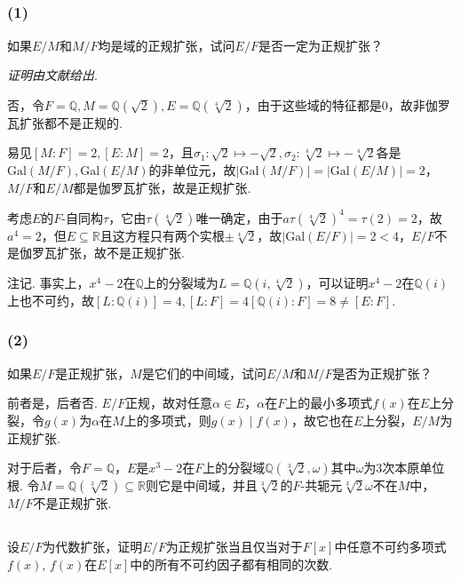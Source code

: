 \subsection{}
\subsubsection{(1)}
如果$E/M$和$M/F$均是域的正规扩张，试问$E/F$是否一定为正规扩张？

\emph{证明由文献}\cite{888841}\cite{575060}\emph{给出}.

\jie 否，令$F=\mathbb{Q}, M=\mathbb{Q}(\sqrt{2}), E=\mathbb{Q}(\sqrt[4]{2})$，由于这些域的特征都是$0$，故非伽罗瓦扩张都不是正规的.

易见$[M:F]=2,[E:M]=2$，且$\sigma_1: \sqrt{2}\mapsto-\sqrt{2}, \sigma_2: \sqrt[4]{2}\mapsto-\sqrt[4]{2}$各是$\mathrm{Gal}(M/F),\mathrm{Gal}(E/M)$的非单位元，故$|\mathrm{Gal}(M/F)|=|\mathrm{Gal}(E/M)|=2$，$M/F$和$E/M$都是伽罗瓦扩张，故是正规扩张.

考虑$E$的$F$-自同构$\tau$，它由$\tau(\sqrt[4]{2})$唯一确定，由于$a\tau(\sqrt[4]{2})^4=\tau(2)=2$，故$a^4=2$，但$E\subseteq\mathbb{R}$且这方程只有两个实根$\pm\sqrt[4]{2}$，故$|\mathrm{Gal}(E/F)|=2<4$，$E/F$不是伽罗瓦扩张，故不是正规扩张.

{\heiti 注记.} 事实上，$x^4-2$在$\mathbb{Q}$上的分裂域为$L=\mathbb{Q}(i,\sqrt[4]{2})$，可以证明$x^4-2$在$\mathbb{Q}(i)$上也不可约，故$[L:\mathbb{Q}(i)]=4, [L:F]=4[\mathbb{Q}(i):F]=8\neq [E:F]$.

\subsubsection{(2)}
如果$E/F$是正规扩张，$M$是它们的中间域，试问$E/M$和$M/F$是否为正规扩张？

\jie 前者是，后者否. $E/F$正规，故对任意$\alpha\in E$，$\alpha$在$F$上的最小多项式$f(x)$在$E$上分裂，令$g(x)$为$\alpha$在$M$上的多项式，则$g(x)\mid f(x)$，故它也在$E$上分裂，$E/M$为正规扩张.

对于后者，令$F=\mathbb{Q}$，$E$是$x^3-2$在$F$上的分裂域$\mathbb{Q}(\sqrt[3]{2},\omega)$其中$\omega$为$3$次本原单位根. 令$M=\mathbb{Q}(\sqrt[3]{2})\subseteq\mathbb{R}$则它是中间域，并且$\sqrt[3]{2}$的$F$-共轭元$\sqrt[3]{2}\omega$不在$M$中，$M/F$不是正规扩张.

\subsection{}
设$E/F$为代数扩张，证明$E/F$为正规扩张当且仅当对于$F[x]$中任意不可约多项式$f(x)$, $f(x)$在$E[x]$中的所有不可约因子都有相同的次数.

